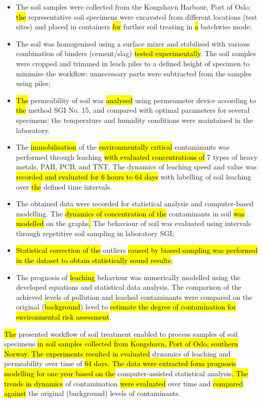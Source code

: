 \documentclass[algorithms,article,submit,pdftex,moreauthors]{Definitions/mdpi}
\begin{document}
\begin{itemize}
	\item The soil samples were collected from the Kongshavn Harbour, Port of Oslo; \hl{the} representative soil specimens were excavated from different locations (test sites) and placed in containers \hl{for} further soil treating in \hl{a }batchwise mode; 
	\item The soil was homogenised using a surface mixer and stabilised with various combination of binders (cement/slag) \hl{tested experimentally}. The soil samples were cropped and trimmed in leach piles to a defined height of specimen to minimise the workflow: unnecessary parts were subtracted from the samples using piles; 
	\item \hl{The }permeability of soil was \hl{analysed} using permeameter device according to \hl{the }method SGI No. 15, and compared with optimal parameters for several specimens; the temperature and humidity conditions were maintained in the laboratory.
	\item The \hl{immobilisation} of \hl{}the \hl{environmentally critical }contaminants was performed through leaching\hl{ with evaluated concentrations of } 7 types of heavy metals, PAH, PCB, and TNT. The dynamics of leaching speed and value was \hl{recorded and evaluated for 6 hours to 64 days} with\hl{ }labelling of soil leaching over \hl{the }defined time intervals. 
	\item The obtained data were recorded for statistical analysis and computer-based modelling. The \hl{dynamics of concentration of the }contaminants in soil \hl{was modelled} on the graphs\hl{. }The behaviour of soil was evaluated using intervals through repetitive soil sampling in laboratory SGI; 
	\item \hl{Statistical correction of the }outliers \hl{caused by biased sampling was performed in the dataset to obtain statistically sound results}; 
	\item The prognosis of \hl{leaching} behaviour\hl{ }was numerically modelled using the developed equations and statistical data analysis. The comparison of the achieved levels of pollution and leached contaminants were compared on the original (\hl{background}) level to \hl{estimate the degree of contamination for environmental risk assessment}.  
\end{itemize}

\hl{The} presented workflow of soil treatment enabled to process samples of soil specimens \hl{in soil samples collected from Kongshavn, Port of Oslo, southern Norway. The experiments resulted in evaluated }dynamics of leaching and permeability over time of \hl{64 days. The data were extracted form prognosis modelling for one year based on the }computer-assisted\hl{ }statistical analysis\hl{. The trends in dynamics} of contamination \hl{were evaluated }over time and \hl{compared against }the original (background) levels of contaminants. 
\end{document}
